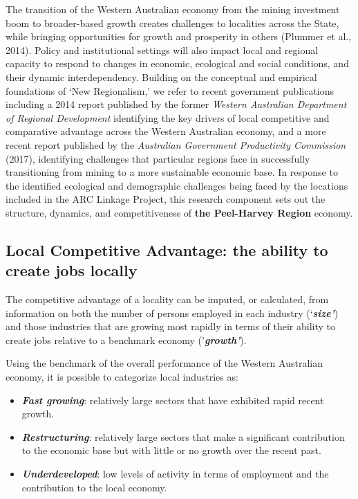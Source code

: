 \documentclass[
]{book}
\begin{document}
The transition of the Western Australian economy from the mining investment boom to broader-based growth creates challenges to localities across the State, while bringing opportunities for growth and prosperity in others (Plummer et al., 2014). Policy and institutional settings will also impact local and regional capacity to respond to changes in economic, ecological and social conditions, and their dynamic interdependency. Building on the conceptual and empirical foundations of `New Regionalism,' we refer to recent government publications including a 2014 report published by the former \emph{Western Australian Department of Regional Development} identifying the key drivers of local competitive and comparative advantage across the Western Australian economy, and a more recent report published by the \emph{Australian Government Productivity Commission} (2017), identifying challenges that particular regions face in successfully transitioning from mining to a more sustainable economic base. In response to the identified ecological and demographic challenges being faced by the locations included in the ARC Linkage Project, this research component sets out the structure, dynamics, and competitiveness of \textbf{the Peel-Harvey Region} economy.

\hypertarget{local-competitive-advantage-the-ability-to-create-jobs-locally}{%
\subsection{Local Competitive Advantage: the ability to create jobs locally}\label{local-competitive-advantage-the-ability-to-create-jobs-locally}}

The competitive advantage of a locality can be imputed, or calculated, from information on both the number of persons employed in each industry (`\textbf{\emph{size'}}) and those industries that are growing most rapidly in terms of their ability to create jobs relative to a benchmark economy ('\textbf{\emph{growth'}}).

Using the benchmark of the overall performance of the Western Australian economy, it is possible to categorize local industries as:

\begin{itemize}
\item
  \textbf{\emph{Fast growing}}: relatively large sectors that have exhibited rapid recent growth.
\item
  \textbf{\emph{Restructuring}}: relatively large sectors that make a significant contribution to the economic base but with little or no growth over the recent past.
\item
  \textbf{\emph{Underdeveloped}}: low levels of activity in terms of employment and the contribution to the local economy.
\end{itemize}
\end{document}
